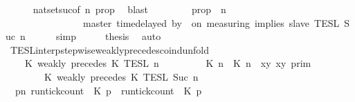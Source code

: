 \begin{isabellebody}
\ \ \ \ \isamarkupfalse%
\ nat{\isacharunderscore}set{\isacharunderscore}suc{\isacharbrackleft}of\ {\isacartoucheopen}n{\isacartoucheclose}\ {\isacharquery}prop{\isacharbrackright}\ \isamarkupfalse%
\ blast\isanewline
\ \ \isamarkupfalse%
\ \isamarkupfalse%
\ {\isacartoucheopen}{\isachardot}{\isachardot}{\isachardot}\ {\isacharequal}\ {\isacharbraceleft}{\isasymrho}{\isachardot}\ {\isacharquery}prop\ {\isasymrho}\ n{\isacharbraceright}\isanewline
\ \ \ \ \ \ \ \ \ \ \ \ \ \ {\isasyminter}\ {\isasymlbrakk}\ master\ time{\isacharminus}delayed\ by\ {\isasymdelta}{\isasymtau}\ on\ measuring\ implies\ slave\ {\isasymrbrakk}\isactrlsub T\isactrlsub E\isactrlsub S\isactrlsub L\isactrlbsup {\isasymge}\ Suc\ n\isactrlesup {\isacartoucheclose}\isanewline
\ \ \ \ \isamarkupfalse%
\ simp\isanewline
\ \ \isamarkupfalse%
\ \isamarkupfalse%
\ {\isacharquery}thesis\ \isamarkupfalse%
\ auto\isanewline
{}\isamarkupfalse%
%
\endisatagproof
{\isafoldproof}%
%
\isadelimproof
\isanewline
%
\endisadelimproof
\isanewline
{}\isamarkupfalse%
\ TESL{\isacharunderscore}interp{\isacharunderscore}stepwise{\isacharunderscore}weakly{\isacharunderscore}precedes{\isacharunderscore}coind{\isacharunderscore}unfold{\isacharcolon}\isanewline
\ \ \ {\isacartoucheopen}{\isasymlbrakk}\ K\ weakly\ precedes\ K\ {\isasymrbrakk}\isactrlsub T\isactrlsub E\isactrlsub S\isactrlsub L\isactrlbsup {\isasymge}\ n\isactrlesup \ {\isacharequal}\isanewline
\ \ \ \ \ \ {\isasymlbrakk}\ {\isacharparenleft}{\isasymlceil}{\isacharhash}\isactrlsup {\isasymle}\ K\ n{\isacharcomma}\ {\isacharhash}\isactrlsup {\isasymle}\ K\ n{\isasymrceil}\ {\isasymin}\ {\isacharparenleft}{\isasymlambda}{\isacharparenleft}x{\isacharcomma}y{\isacharparenright}{\isachardot}\ x{\isasymle}y{\isacharparenright}{\isacharparenright}\ {\isasymrbrakk}\isactrlsub p\isactrlsub r\isactrlsub i\isactrlsub m\isanewline
\ \ \ \ \ \ {\isasyminter}\ {\isasymlbrakk}\ K\ weakly\ precedes\ K\ {\isasymrbrakk}\isactrlsub T\isactrlsub E\isactrlsub S\isactrlsub L\isactrlbsup {\isasymge}\ Suc\ n\isactrlesup {\isacartoucheclose}\isanewline
%
\isadelimproof
%
\endisadelimproof
%
\isatagproof
{}\isamarkupfalse%
\ {\isacharminus}\isanewline
\ \ \isamarkupfalse%
\ {\isacartoucheopen}{\isacharbraceleft}{\isasymrho}{\isachardot}\ {\isasymforall}p{\isasymge}n{\isachardot}\ {\isacharparenleft}run{\isacharunderscore}tick{\isacharunderscore}count\ {\isasymrho}\ K\ p{\isacharparenright}\ {\isasymle}\ {\isacharparenleft}run{\isacharunderscore}tick{\isacharunderscore}count\ {\isasymrho}\ K\ p{\isacharparenright}{\isacharbraceright}\isanewline

\end{isabellebody}
